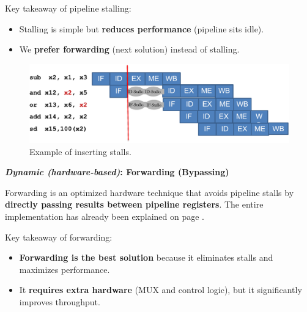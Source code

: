 \highspace
Key takeaway of pipeline stalling:
\begin{itemize}
    \item[\textcolor{Red2}{\faIcon{times}}] Stalling is simple but \textbf{reduces performance} (pipeline sits idle).
    \item[\textcolor{Green3}{\faIcon{check}}] We \textbf{prefer forwarding} (next solution) instead of stalling.
\end{itemize}

\begin{figure}[!htp]
    \centering
    \includegraphics[width=\textwidth]{img/insertion-of-stalls-1.pdf}
    \caption{Example of inserting stalls.}
\end{figure}

\highspace
\begin{flushleft}
    \textcolor{Green3}{ \textbf{\emph{Dynamic (hardware-based)}: Forwarding (Bypassing)}}
\end{flushleft}
Forwarding is an optimized hardware technique that avoids pipeline stalls by \textbf{directly passing results between pipeline registers}. The entire implementation has already been explained on page .

\highspace
Key takeaway of forwarding:
\begin{itemize}
    \item[\textcolor{Green3}{\faIcon{check}}] \textcolor{Green3}{\textbf{Forwarding is the best solution}} because it eliminates stalls and maximizes performance.
    \item It \textbf{requires extra hardware} (MUX and control logic), but it significantly improves throughput.
\end{itemize}

